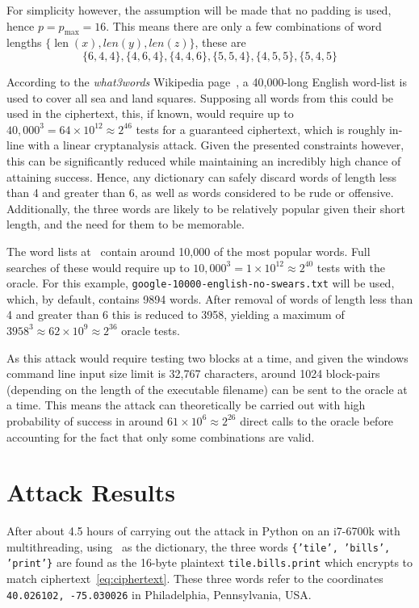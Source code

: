 \documentclass[11pt]{article}
\DeclareMathOperator{\len}{len}
\begin{document}
\begin{multicols*}{2}
        For simplicity however, the assumption will be made that no padding is used, hence $p = p_{\max} = 16$.
        This means there are only a few combinations of word lengths $\{\len(x), len(y), len(z)\}$, these are
        \[\{6, 4, 4\}, \{4, 6, 4\}, \{4, 4, 6\}, \{5, 5, 4\}, \{4, 5, 5\}, \{5, 4, 5\}\]

        According to the \textit{what3words} Wikipedia page~\cite{what3words_wikipedia}, a 40,000-long English word-list is used to cover all sea and land squares.
        Supposing all words from this could be used in the ciphertext, this, if known, would require up to $40,000^3 = 64\times10^{12} \approx 2^{46}$ tests for a guaranteed ciphertext, which is roughly in-line with a linear cryptanalysis attack.
        Given the presented constraints however, this can be significantly reduced while maintaining an incredibly high chance of attaining success.
        Hence, any dictionary can safely discard words of length less than 4 and greater than 6, as well as words considered to be rude or offensive.
        Additionally, the three words are likely to be relatively popular given their short length, and the need for them to be memorable.

        The word lists at~\cite{attack_dictionary} contain around 10,000 of the most popular words.
        Full searches of these would require up to $10,000^3 = 1\times10^{12} \approx 2^{40}$ tests with the oracle.
        For this example, \texttt{google-10000-english-no-swears.txt} will be used, which, by default, contains 9894 words.
        After removal of words of length less than 4 and greater than 6 this is reduced to 3958, yielding a maximum of $3958^3 \approx 62\times10^{9} \approx 2^{36}$ oracle tests.

        As this attack would require testing two blocks at a time, and given the windows command line input size limit is 32,767 characters, around 1024 block-pairs (depending on the length of the executable filename) can be sent to the oracle at a time.
        This means the attack can theoretically be carried out with high probability of success in around $61\times10^6 \approx 2^{26}$ direct calls to the oracle before accounting for the fact that only some combinations are valid.


        \section{Attack Results}\label{sec:attack-results}
        After about 4.5 hours of carrying out the attack in Python on an i7-6700k with multithreading, using~\cite{attack_dictionary} as the dictionary, the three words \texttt{\{'tile', 'bills', 'print'\}} are found as the 16-byte plaintext \texttt{tile.bills.print} which encrypts to match ciphertext~\eqref{eq:ciphertext}.
        These three words refer to the coordinates \texttt{40.026102, -75.030026} in Philadelphia, Pennsylvania, USA\@.



\end{multicols*}
\end{document}
